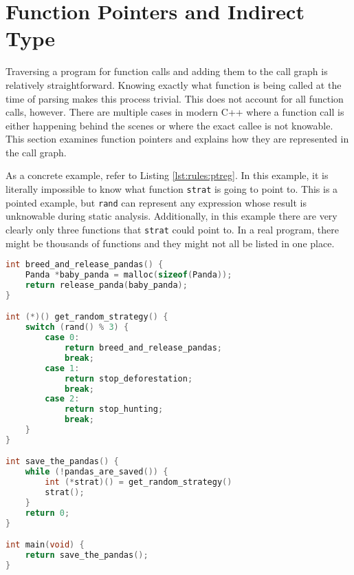 \section{Function Pointers and Indirect Type}\label{sec:rules:funptrs}

Traversing a program for function calls and adding them to the call graph is relatively straightforward.  Knowing exactly what function is being called at the time of parsing makes this process trivial.  This does not account for all function calls, however.  There are multiple cases in modern C++ where a function call is either happening behind the scenes or where the exact callee is not knowable.  This section examines function pointers and explains how they are represented in the call graph.  

As a concrete example, refer to Listing \ref{lst:rules:ptreg}.  In this example, it is literally impossible to know what function \lstinline{strat} is going to point to.  This is a pointed example, but \lstinline{rand} can represent any expression whose result is unknowable during static analysis.  Additionally, in this example there are very clearly only three functions that \lstinline{strat} could point to.  In a real program, there might be thousands of functions and they might not all be listed in one place.  

\noindent\begin{minipage}[t]{\linewidth}
\begin{lstlisting}[language=C,caption={In this example C program, it is impossible to know statically what the value of strat is.  Because of this, funqual requires the programmer to annotate function pointers with additional type information. },label={lst:rules:ptreg}]
int breed_and_release_pandas() {
    Panda *baby_panda = malloc(sizeof(Panda));
    return release_panda(baby_panda);
}

int (*)() get_random_strategy() {
    switch (rand() % 3) {
        case 0:
            return breed_and_release_pandas;
            break;
        case 1:
            return stop_deforestation;
            break;
        case 2:
            return stop_hunting;
            break;
    }
}

int save_the_pandas() {
    while (!pandas_are_saved()) {
        int (*strat)() = get_random_strategy()
        strat();
    }
    return 0;
}

int main(void) {
    return save_the_pandas();
}
\end{lstlisting}
\end{minipage}

